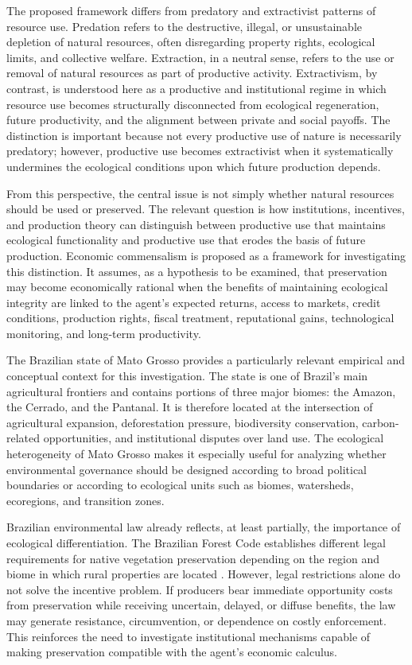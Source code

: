The proposed framework differs from predatory and extractivist patterns of resource use. Predation refers to the destructive, illegal, or unsustainable depletion of natural resources, often disregarding property rights, ecological limits, and collective welfare. Extraction, in a neutral sense, refers to the use or removal of natural resources as part of productive activity. Extractivism, by contrast, is understood here as a productive and institutional regime in which resource use becomes structurally disconnected from ecological regeneration, future productivity, and the alignment between private and social payoffs. The distinction is important because not every productive use of nature is necessarily predatory; however, productive use becomes extractivist when it systematically undermines the ecological conditions upon which future production depends.

From this perspective, the central issue is not simply whether natural resources should be used or preserved. The relevant question is how institutions, incentives, and production theory can distinguish between productive use that maintains ecological functionality and productive use that erodes the basis of future production. Economic commensalism is proposed as a framework for investigating this distinction. It assumes, as a hypothesis to be examined, that preservation may become economically rational when the benefits of maintaining ecological integrity are linked to the agent's expected returns, access to markets, credit conditions, production rights, fiscal treatment, reputational gains, technological monitoring, and long-term productivity.

The Brazilian state of Mato Grosso provides a particularly relevant empirical and conceptual context for this investigation. The state is one of Brazil's main agricultural frontiers and contains portions of three major biomes: the Amazon, the Cerrado, and the Pantanal. It is therefore located at the intersection of agricultural expansion, deforestation pressure, biodiversity conservation, carbon-related opportunities, and institutional disputes over land use. The ecological heterogeneity of Mato Grosso makes it especially useful for analyzing whether environmental governance should be designed according to broad political boundaries or according to ecological units such as biomes, watersheds, ecoregions, and transition zones.

Brazilian environmental law already reflects, at least partially, the importance of ecological differentiation. The Brazilian Forest Code establishes different legal requirements for native vegetation preservation depending on the region and biome in which rural properties are located \cite{brasil2012florestal}. However, legal restrictions alone do not solve the incentive problem. If producers bear immediate opportunity costs from preservation while receiving uncertain, delayed, or diffuse benefits, the law may generate resistance, circumvention, or dependence on costly enforcement. This reinforces the need to investigate institutional mechanisms capable of making preservation compatible with the agent's economic calculus.

